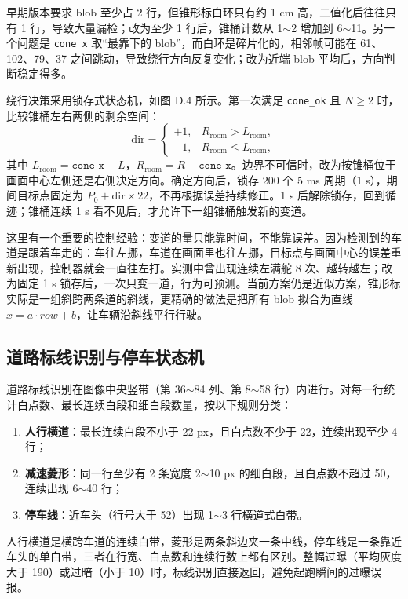 \documentclass{MaiTechReport}
\begin{document}
早期版本要求 blob 至少占 2 行，但锥形标白环只有约 1 cm 高，二值化后往往只有 1 行，导致大量漏检；改为至少 1 行后，锥桶计数从 1$\sim$2 增加到 6$\sim$11。另一个问题是 \texttt{cone\_x} 取“最靠下的 blob”，而白环是碎片化的，相邻帧可能在 61、102、79、37 之间跳动，导致绕行方向反复变化；改为近端 blob 平均后，方向判断稳定得多。

绕行决策采用锁存式状态机，如图 D.4 所示。第一次满足 \texttt{cone\_ok} 且 $N\ge2$ 时，比较锥桶左右两侧的剩余空间：
\begin{equation}
  \mathrm{dir}=
  \begin{cases}
    +1, & R_{\mathrm{room}}>L_{\mathrm{room}},\\
    -1, & R_{\mathrm{room}}\le L_{\mathrm{room}},
  \end{cases}
  \label{eq:cone_dir}
\end{equation}
其中 $L_{\mathrm{room}}=\texttt{cone\_x}-L$，$R_{\mathrm{room}}=R-\texttt{cone\_x}$。边界不可信时，改为按锥桶位于画面中心左侧还是右侧决定方向。确定方向后，锁存 200 个 5 ms 周期（1 s），期间目标点固定为 $P_0+\mathrm{dir}\times22$，不再根据误差持续修正。1 s 后解除锁存，回到循迹；锥桶连续 1 s 看不见后，才允许下一组锥桶触发新的变道。



这里有一个重要的控制经验：变道的量只能靠时间，不能靠误差。因为检测到的车道是跟着车走的：车往左挪，车道在画面里也往左挪，目标点与画面中心的误差重新出现，控制器就会一直往左打。实测中曾出现连续左满舵 8 次、越转越左；改为固定 1 s 锁存后，一次只变一道，行为可预测。当前方案仍是近似方案，锥形标实际是一组斜跨两条道的斜线，更精确的做法是把所有 blob 拟合为直线 $x=a\cdot row+b$，让车辆沿斜线平行行驶。

\subsection{道路标线识别与停车状态机}
道路标线识别在图像中央竖带（第 36$\sim$84 列、第 8$\sim$58 行）内进行。对每一行统计白点数、最长连续白段和细白段数量，按以下规则分类：
\begin{enumerate}
  \item \textbf{人行横道}：最长连续白段不小于 22 px，且白点数不少于 22，连续出现至少 4 行；
  \item \textbf{减速菱形}：同一行至少有 2 条宽度 2$\sim$10 px 的细白段，且白点数不超过 50，连续出现 6$\sim$40 行；
  \item \textbf{停车线}：近车头（行号大于 52）出现 1$\sim$3 行横道式白带。
\end{enumerate}
人行横道是横跨车道的连续白带，菱形是两条斜边夹一条中线，停车线是一条靠近车头的单白带，三者在行宽、白点数和连续行数上都有区别。整幅过曝（平均灰度大于 190）或过暗（小于 10）时，标线识别直接返回，避免起跑瞬间的过曝误报。
\end{document}
